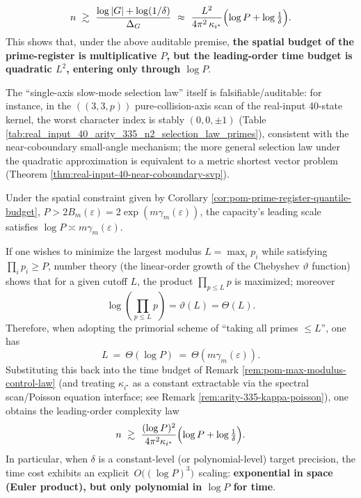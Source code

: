 \begin{remark}
\[
n\ \gtrsim\ \frac{\log|G|+\log(1/\delta)}{\Delta_G}
\ \approx\
\frac{L^2}{4\pi^2\,\kappa_{i^\star}}\Bigl(\log P+\log\tfrac{1}{\delta}\Bigr).
\]
This shows that, under the above auditable premise, \textbf{the spatial budget of the prime-register is multiplicative \(P\), but the leading-order time budget is quadratic \(L^2\), entering only through \(\log P\)}.
\par
The ``single-axis slow-mode selection law'' itself is falsifiable/auditable: for instance, in the \(((3,3,p))\) pure-collision-axis scan of the real-input 40-state kernel, the worst character index is stably \((0,0,\pm1)\) (Table \ref{tab:real_input_40_arity_335_n2_selection_law_primes}), consistent with the near-coboundary small-angle mechanism; the more general selection law under the quadratic approximation is equivalent to a metric shortest vector problem (Theorem \ref{thm:real-input-40-near-coboundary-svp}).
\end{remark}

\begin{remark}\label{rem:pom-primorial-polylog-time}
Under the spatial constraint given by Corollary \ref{cor:pom-prime-register-quantile-budget},
\(
P>2B_m(\varepsilon)=2\exp(m\gamma_m(\varepsilon))
\),
the capacity's leading scale satisfies \(\log P\asymp m\gamma_m(\varepsilon)\).
\par
If one wishes to minimize the largest modulus \(L=\max_i p_i\) while satisfying \(\prod_i p_i\ge P\), number theory (the linear-order growth of the Chebyshev \(\vartheta\) function) shows that for a given cutoff \(L\), the product \(\prod_{p\le L}p\) is maximized; moreover
\[
\log\!\left(\prod_{p\le L}p\right)=\vartheta(L)=\Theta(L).
\]
Therefore, when adopting the primorial scheme of ``taking all primes \(\le L\)'', one has
\[
L\ =\ \Theta(\log P)\ =\ \Theta(m\gamma_m(\varepsilon)).
\]
Substituting this back into the time budget of Remark \ref{rem:pom-max-modulus-control-law} (and treating \(\kappa_{i^\star}\) as a constant extractable via the spectral scan/Poisson equation interface; see Remark \ref{rem:arity-335-kappa-poisson}), one obtains the leading-order complexity law
\[
n\ \gtrsim\ \frac{(\log P)^2}{4\pi^2\kappa_{i^\star}}\Bigl(\log P+\log\tfrac{1}{\delta}\Bigr).
\]
In particular, when \(\delta\) is a constant-level (or polynomial-level) target precision, the time cost exhibits an explicit \(\,O\big((\log P)^3\big)\,\) scaling: \textbf{exponential in space (Euler product), but only polynomial in \(\log P\) for time}.
\end{remark}


